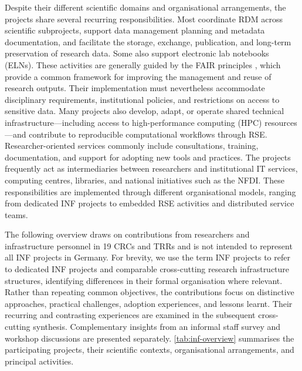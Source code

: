\documentclass{eceasst}
\begin{document}
Despite their different scientific domains and
organisational arrangements, the projects share
several recurring responsibilities.
Most coordinate RDM across scientific subprojects,
support data management planning and metadata
documentation, and facilitate the storage, exchange,
publication, and long-term preservation of research
data. Some also support electronic lab notebooks
(ELNs).
These activities are generally guided by the
FAIR principles \cite{WilkinsonDumontier2016},
which provide a common framework for improving
the management and reuse of research outputs.
Their implementation must nevertheless accommodate
disciplinary requirements, institutional policies,
and restrictions on access to sensitive data.
Many projects also develop, adapt, or operate
shared technical infrastructure---including access
to high-performance computing (HPC) resources---and
contribute to reproducible computational workflows
through RSE.
Researcher-oriented services commonly include
consultations, training, documentation, and support
for adopting new tools and practices.
The projects frequently act as intermediaries
between researchers and institutional IT services,
computing centres, libraries, and national initiatives
such as the NFDI.
These responsibilities are implemented through
different organisational models, ranging from
dedicated INF projects to embedded RSE activities
and distributed service teams.

The following overview draws on contributions from
researchers and infrastructure personnel in 19 CRCs
and TRRs and is not intended to represent all INF
projects in Germany.
For brevity, we use the term INF projects to refer
to dedicated INF projects and comparable cross-cutting
research infrastructure structures, identifying
differences in their formal organisation where relevant.
Rather than repeating common objectives, the
contributions focus on distinctive approaches,
practical challenges, adoption experiences, and
lessons learnt.
Their recurring and contrasting experiences are
examined in the subsequent cross-cutting synthesis.
Complementary insights from an informal staff survey
and workshop discussions are presented separately.
\autoref{tab:inf-overview} summarises the participating
projects, their scientific contexts, organisational
arrangements, and principal activities.

\pagebreak

\begingroup
\small
\setlength{\tabcolsep}{2.5pt}
\renewcommand{\arraystretch}{1.12}
\setlength{\LTleft}{0pt}
\setlength{\LTright}{0pt}
\end{document}
